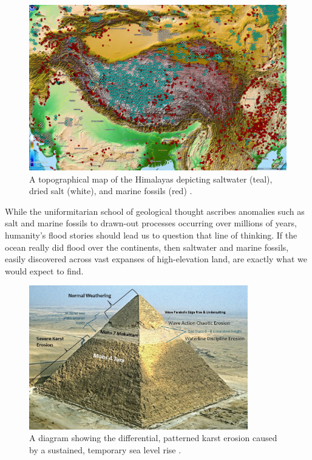 \documentclass[10pt,twocolumn,letterpaper]{article}
\begin{document}
\begin{figure}[t]
\begin{center}
   \includegraphics[width=1\linewidth]{tibet.jpg}
\end{center}
   \caption{A topographical map of the Himalayas depicting saltwater (teal), dried salt (white), and marine fossils (red) \cite{15,16,86,87}.}
\label{fig:3}
\label{fig:onecol}
\end{figure}

While the uniformitarian school of geological thought ascribes anomalies such as salt and marine fossils to drawn-out processes occurring over millions of years, humanity's flood stories should lead us to question that line of thinking. If the ocean really did flood over the continents, then saltwater and marine fossils, easily discovered across vast expanses of high-elevation land, are exactly what we would expect to find.

\begin{figure}[t]
\begin{center}
\includegraphics[width=0.85\textwidth]{khafre.jpg}
\end{center}
   \caption{A diagram showing the differential, patterned karst erosion caused by a sustained, temporary sea level rise \cite{27}.}
\label{fig:4}
\end{figure}
\end{document}
